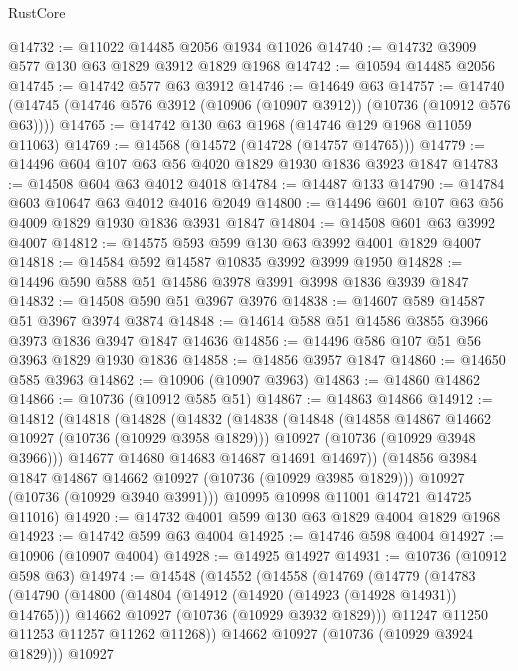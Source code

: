 \begin{lexlean}{RustCore}
\begin{coremodule}
@14732 := @11022 @14485 @2056 @1934 @11026
@14740 := @14732 @3909 @577 @130 @63 @1829 @3912 @1829 @1968
@14742 := @10594 @14485 @2056
@14745 := @14742 @577 @63 @3912
@14746 := @14649 @63
@14757 := @14740 (@14745 (@14746 @576 @3912 (@10906 (@10907 @3912)) (@10736 (@10912 @576 @63))))
@14765 := @14742 @130 @63 @1968 (@14746 @129 @1968 @11059 @11063)
@14769 := @14568 (@14572 (@14728 (@14757 @14765)))
@14779 := @14496 @604 @107 @63 @56 @4020 @1829 @1930 @1836 @3923 @1847
@14783 := @14508 @604 @63 @4012 @4018
@14784 := @14487 @133
@14790 := @14784 @603 @10647 @63 @4012 @4016 @2049
@14800 := @14496 @601 @107 @63 @56 @4009 @1829 @1930 @1836 @3931 @1847
@14804 := @14508 @601 @63 @3992 @4007
@14812 := @14575 @593 @599 @130 @63 @3992 @4001 @1829 @4007
@14818 := @14584 @592 @14587 @10835 @3992 @3999 @1950
@14828 := @14496 @590 @588 @51 @14586 @3978 @3991 @3998 @1836 @3939 @1847
@14832 := @14508 @590 @51 @3967 @3976
@14838 := @14607 @589 @14587 @51 @3967 @3974 @3874
@14848 := @14614 @588 @51 @14586 @3855 @3966 @3973 @1836 @3947 @1847 @14636
@14856 := @14496 @586 @107 @51 @56 @3963 @1829 @1930 @1836
@14858 := @14856 @3957 @1847
@14860 := @14650 @585 @3963
@14862 := @10906 (@10907 @3963)
@14863 := @14860 @14862
@14866 := @10736 (@10912 @585 @51)
@14867 := @14863 @14866
@14912 := @14812
    (@14818
      (@14828
        (@14832
          (@14838
            (@14848
              (@14858 @14867 @14662 @10927 (@10736 (@10929 @3958 @1829)))
              @10927
              (@10736 (@10929 @3948 @3966)))
            @14677
            @14680
            @14683
            @14687
            @14691
            @14697))
        (@14856 @3984 @1847 @14867 @14662 @10927 (@10736 (@10929 @3985 @1829)))
        @10927
        (@10736 (@10929 @3940 @3991)))
      @10995
      @10998
      @11001
      @14721
      @14725
      @11016)
@14920 := @14732 @4001 @599 @130 @63 @1829 @4004 @1829 @1968
@14923 := @14742 @599 @63 @4004
@14925 := @14746 @598 @4004
@14927 := @10906 (@10907 @4004)
@14928 := @14925 @14927
@14931 := @10736 (@10912 @598 @63)
@14974 := @14548
    (@14552
      (@14558
        (@14769
          (@14779
            (@14783
              (@14790
                (@14800
                  (@14804 (@14912 (@14920 (@14923 (@14928 @14931)) @14765)))
                  @14662
                  @10927
                  (@10736 (@10929 @3932 @1829)))
                @11247
                @11250
                @11253
                @11257
                @11262
                @11268))
            @14662
            @10927
            (@10736 (@10929 @3924 @1829)))
          @10927

\end{coremodule}
\end{lexlean}
